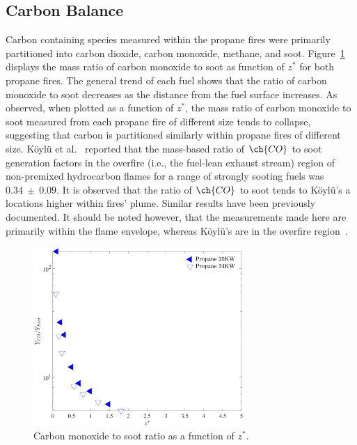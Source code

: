 \documentclass[12pt]{ussci}
\begin{document}
\subsection{Carbon Balance}
Carbon containing species measured within the propane fires were primarily partitioned into carbon dioxide, carbon monoxide, methane, and soot. Figure~\ref{fig:C2S} displays the mass ratio of carbon monoxide to soot as function of $z^*$ for both propane fires.  The general trend of each fuel shows that the ratio of carbon monoxide to soot decreases as the distance from the fuel surface increases. As observed, when plotted as a function of $z^*$, the mass ratio of carbon monoxide to soot measured from each propane fire of different size tends to collapse, suggesting that carbon is partitioned similarly within propane fires of different size. K\"{o}yl\"{u} et al.~\cite{koylu1991} reported that the mass-based ratio of $\ch{CO}$ to soot generation factors in the overfire (i.e., the fuel-lean exhaust stream) region of non-premixed hydrocarbon flames for a range of strongly sooting fuels was $0.34~\pm~0.09$. It is observed that the ratio of $\ch{CO}$ to soot tends to K\"{o}yl\"{u}'s a locations higher within fires' plume. Similar results have been previously documented. It should be noted however, that the measurements made here are primarily within the flame envelope, whereas K\"{o}yl\"{u}'s are in the overfire region~\cite{koylu1991}.
\begin{figure}[h!]
	\centering
\includegraphics[width=8cm, keepaspectratio]{CO_Soot.pdf}
	\caption[Carbon monoxide to soot ratio as a function of mixture fraction]{Carbon monoxide to soot ratio as a function of $z^*$.}
	\label{fig:C2S}
\end{figure}
\end{document}
